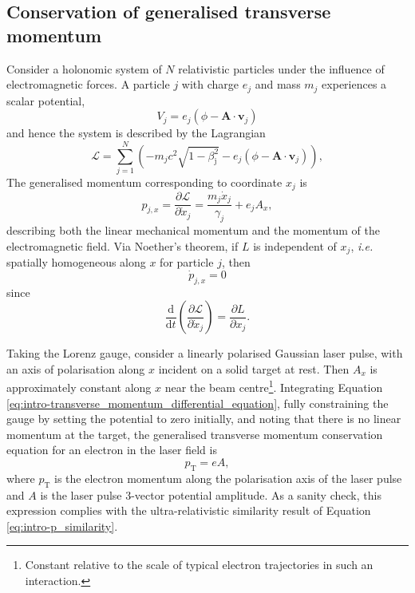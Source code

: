 \subsection{Conservation of generalised transverse momentum}\label{sec:intro_conservation-generalised-mometum}
Consider a holonomic system of $N$ relativistic particles under the influence of electromagnetic forces. A particle $j$ with charge $e_j$ and mass $m_j$ experiences a scalar potential,
\begin{equation}
	V_{j} = e_j(\phi - \mathbf{A} \cdot \mathbf{v}_{j})
\end{equation}
and hence the system is described by the Lagrangian \cite{goldsteinClassicalMechanics2013}
\begin{equation}
	\mathcal{L} = \sum^N_{j=1}\left( - m_jc^2\sqrt{1-\beta^2_\mathrm{j}} - e_j(\phi - \mathbf{A} \cdot \mathbf{v}_j) \right),
\end{equation}
The generalised momentum corresponding to coordinate $x_j$ is
\begin{equation}
	p_{j,x} = \frac{\partial \mathcal{L} }{\partial \dot{x}_j} = \frac{m_j\dot{x}_j }{\gamma_j}+ e_jA_x,
\end{equation}
describing both the linear mechanical momentum and the momentum of the electromagnetic field. Via Noether's theorem, if $L$ is independent of $x_j$, \textit{i.e.} spatially homogeneous along $x$ for particle $j$, then 
\begin{equation}\label{eq:intro-transverse_momentum_differential_equation}
	\dot{p}_{j,x} = 0
\end{equation}
since
\begin{equation}
	\frac{\mathrm{d}}{\mathrm{d}t}\left(\frac{\partial \mathcal{L} }{\partial \dot{x}_j}\right) = \frac{\partial L}{\partial x_j}.
\end{equation}

Taking the Lorenz gauge, consider a linearly polarised Gaussian laser pulse, with an axis of polarisation along $x$ incident on a solid target at rest. Then $A_x$ is approximately constant along $x$ near the beam centre\footnote{Constant relative to the scale of typical electron trajectories in such an interaction.}. Integrating Equation \ref{eq:intro-transverse_momentum_differential_equation}, fully constraining the gauge by setting the potential to zero initially, and noting that there is no linear momentum at the target, the generalised transverse momentum conservation equation for an electron in the laser field is
\begin{equation}\label{eq:intro-transverse_momentum_conservation_no_initial_momentum}
	p_\mathrm{T} = eA,
\end{equation}
where $p_\mathrm{T}$ is the electron momentum along the polarisation axis of the laser pulse and $A$ is the laser pulse 3-vector potential amplitude. As a sanity check, this expression complies with the ultra-relativistic similarity result of Equation \ref{eq:intro-p_similarity}.

